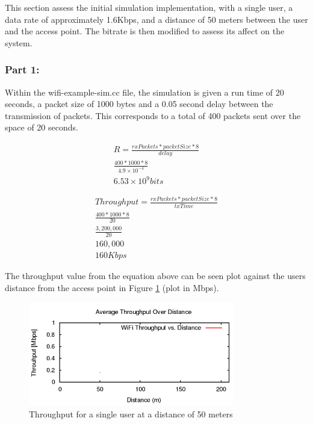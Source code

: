 This section assess the initial simulation implementation, with a single user, a
data rate of approximately 1.6Kbps, and a distance of 50 meters between the user
and the access point. The bitrate is then modified to assess its affect on the
system.

\subsubsection{Part 1:}

Within the wifi-example-sim.cc file, the simulation is given a run time of 20
seconds, a packet size of 1000 bytes and a 0.05 second delay between the
transmission of packets. This corresponds to a total of 400 packets sent over
the space of 20 seconds.

\begin{gather*}
	R=\frac{rxPackets*packetSize*8}{delay} \\
	\frac{400*1000*8}{4.9\times10^{-4}} \\
	6.53\times10^{9}bits
\end{gather*}

\begin{gather*}
	Throughput=\frac{rxPackets*packetSize*8}{txTime} \\
	\frac{400*1000*8}{20} \\
	\frac{3,200,000}{20} \\
	160,000 \\
	160Kbps
\end{gather*}

The throughput value from the equation above can be seen plot against the users
distance from the access point in Figure \ref{fig:QAthroughput} (plot in Mbps).
\begin{figure}[H]
	\centering
	\includegraphics[width=0.8\textwidth]{images/EE500/QA/P1/Images/wifi-throughput}
	\caption{Throughput for a single user at a distance of 50 meters}
	\label{fig:QAthroughput}
\end{figure}

